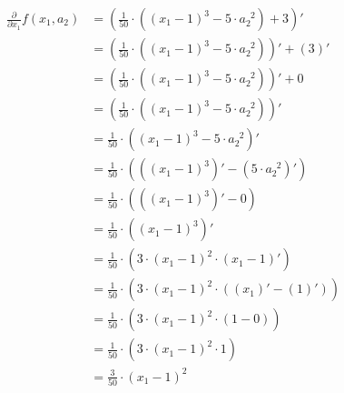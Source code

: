 \documentclass[titlepage]{article}
\begin{document}
            \begin{align*}
              \frac{\partial}{\partial x_1} f(x_1, a_2)
                & = \left(
                      \frac{1}{50}
                      \cdot
                      \left( (x_1 - 1)^3 - 5 \cdot a_2^{\enspace 2} \right)
                      +
                      3
                    \right)' \\
                & = \left(
                      \frac{1}{50}
                      \cdot
                      \left( (x_1 - 1)^3 - 5 \cdot a_2^{\enspace 2} \right)
                    \right)'
                    +
                    (3)' \\
                & = \left(
                      \frac{1}{50}
                      \cdot
                      \left( (x_1 - 1)^3 - 5 \cdot a_2^{\enspace 2} \right)
                    \right)'
                    +
                    0 \\
                & = \left(
                      \frac{1}{50}
                      \cdot
                      \left( (x_1 - 1)^3 - 5 \cdot a_2^{\enspace 2} \right)
                    \right)' \\
                & = \frac{1}{50}
                    \cdot
                    \left( (x_1 - 1)^3 - 5 \cdot a_2^{\enspace 2} \right)' \\
                & = \frac{1}{50}
                    \cdot
                    \left(
                      \left(
                        (x_1 - 1)^3 \right)' - \left(5 \cdot a_2^{\enspace 2}
                      \right)'
                    \right) \\
                & = \frac{1}{50}
                    \cdot
                    \left( \left( (x_1 - 1)^3 \right)' - 0 \right) \\
                & = \frac{1}{50}
                    \cdot
                    \left( (x_1 - 1)^3 \right)' \\
                & = \frac{1}{50}
                    \cdot
                    \left(
                      3 \cdot (x_1 - 1)^2 \cdot \left( x_1 - 1 \right)'
                    \right) \\
                & = \frac{1}{50}
                    \cdot
                    \left(
                      3 \cdot (x_1 - 1)^2 \cdot \left( (x_1)' - (1)' \right)
                    \right) \\
                & = \frac{1}{50}
                    \cdot
                    \left( 3 \cdot (x_1 - 1)^2 \cdot (1 - 0) \right) \\
                & = \frac{1}{50}
                    \cdot
                    \left( 3 \cdot (x_1 - 1)^2 \cdot 1 \right) \\
                & = \frac{3}{50} \cdot (x_1 - 1)^2 \\
            \end{align*}
\end{document}
